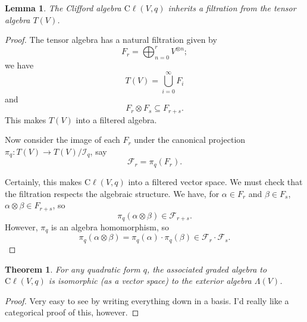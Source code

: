 \documentclass[a4paper,10pt]{scrreprt}
\newcommand{\cliff}{\mathrm{C}\ell}
\theoremstyle{definition}
\theoremstyle{plain}
\newtheorem{theorem}{Theorem}[section]
\newtheorem{lemma}{Lemma}[section]
\theoremstyle{remark}
\begin{document}
\begin{lemma}
  The Clifford algebra $\cliff(V,q)$ inherits a filtration from the tensor algebra $T(V)$.
\end{lemma}
\begin{proof}
  The tensor algebra has a natural filtration given by
  \begin{equation*}
    F_{r} = \bigoplus_{n=0}^{r} V^{\otimes n};
  \end{equation*}
  we have 
  \begin{equation*}
    T(V) = \bigcup_{i=0}^{\infty} F_{i}
  \end{equation*}
  and
  \begin{equation*}
    F_{r} \otimes F_{s} \subseteq F_{r+s}.
  \end{equation*}
  This makes $T(V)$ into a filtered algebra.

  Now consider the image of each $F_{r}$ under the canonical projection $\pi_{q}\colon T(V) \to T(V) / \mathscr{I}_{q}$, say
  \begin{equation*}
    \mathscr{F}_{r} = \pi_{q}(F_{r}).
  \end{equation*}

  Certainly, this makes $\cliff(V, q)$ into a filtered vector space. We must check that the filtration respects the algebraic structure. We have, for $\alpha \in F_{r}$ and $\beta \in F_{s}$, $\alpha \otimes \beta \in F_{r + s}$, so
  \begin{equation*}
    \pi_{q}(\alpha\otimes \beta) \in \mathscr{F}_{r+s}.
  \end{equation*}
  However, $\pi_{q}$ is an algebra homomorphism, so
  \begin{equation*}
    \pi_{q}(\alpha \otimes \beta) = \pi_{q}(\alpha) \cdot \pi_{q}(\beta) \in \mathscr{F}_{r} \cdot \mathscr{F}_{s}.
  \end{equation*}
\end{proof}

\begin{theorem}
  For any quadratic form $q$, the associated graded algebra to $\cliff(V,q)$ is isomorphic (as a vector space) to the exterior algebra $\Lambda(V)$.
\end{theorem}
\begin{proof}
  Very easy to see by writing everything down in a basis. I'd really like a categorical proof of this, however.
\end{proof}
\end{document}
